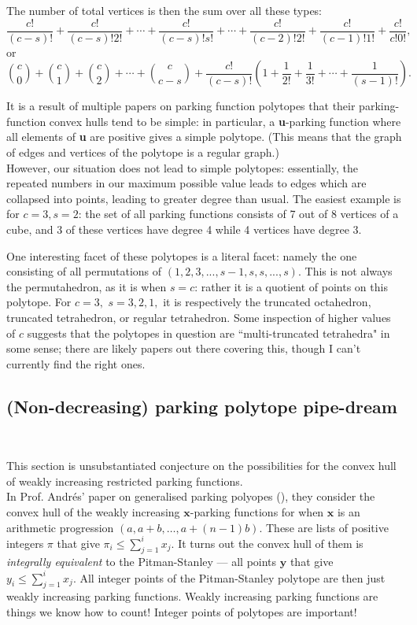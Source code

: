 The number of total vertices is then the sum over all these types: $$\frac{c!}{(c-s)!}+\frac{c!}{(c-s)!2!}+\cdots+\frac{c!}{(c-s)!s!}+\cdots+\frac{c!}{(c-2)!2!}+\frac{c!}{(c-1)!1!}+\frac{c!}{c!0!},$$ or $$\binom{c}{0}+\binom{c}{1}+\binom{c}{2}+\cdots+\binom{c}{c-s}+\frac{c!}{(c-s)!}\left(1+\frac{1}{2!}+\frac{1}{3!}+\cdots+\frac{1}{(s-1)!}\right).$$

It is a result of multiple papers on parking function polytopes that their parking-function convex hulls tend to be simple: in particular, a \textbf{u}-parking function where all elements of \textbf{u} are positive gives a simple polytope. (This means that the graph of edges and vertices of the polytope is a regular graph.)\\

However, our situation does not lead to simple polytopes: essentially, the repeated numbers in our maximum possible value leads to edges which are collapsed into points, leading to greater degree than usual. The easiest example is for $c=3,s=2$: the set of all parking functions consists of 7 out of 8 vertices of a cube, and 3 of these vertices have degree 4 while 4 vertices have degree 3.

One interesting facet of these polytopes is a literal facet: namely the one consisting of all permutations of $(1,2,3,...,s-1,s,s,...,s).$ This is not always the permutahedron, as it is when $s=c$: rather it is a quotient of points on this polytope. For $c=3,$ $s=3,2,1,$ it is respectively the truncated octahedron, truncated tetrahedron, or regular tetrahedron. Some inspection of higher values of $c$ suggests that the polytopes in question are ``multi-truncated tetrahedra" in some sense; there are likely papers out there covering this, though I can't currently find the right ones.

\subsection*{(Non-decreasing) parking polytope pipe-dream}~

This section is unsubstantiated conjecture on the possibilities for the convex hull of weakly increasing restricted parking functions. \\

In Prof. Andr\'es' paper on generalised parking polyopes (\cite{andres-others-2023}), they consider the convex hull of the weakly increasing $\mathbf{x}$-parking functions for when $\mathbf{x}$ is an arithmetic progression $(a, a + b, \dots, a + (n - 1)b)$. These are lists of positive integers $\pi$ that give $\pi_{i} \le \sum_{j = 1}^{i} x_{j}$. It turns out the convex hull of them is \emph{integrally equivalent} to the Pitman-Stanley --- all points $\mathbf{y}$ that give $y_{i} \le \sum_{j = 1}^{i} x_{j}$. All integer points of the Pitman-Stanley polytope are then just weakly increasing parking functions. Weakly increasing parking functions are things we know how to count! Integer points of polytopes are important! \\

